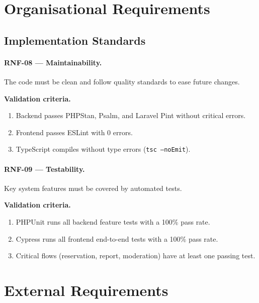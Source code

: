 \documentclass[11pt,a4paper,oneside]{report}
\begin{document}
\section{Organisational Requirements}

\subsection{Implementation Standards}
\label{nfr:implementation}

\paragraph{RNF-08 --- Maintainability.} \label{req:RNF-08}
The code must be clean and follow quality standards to ease future changes.

\textbf{Validation criteria.}
\begin{enumerate}
\item Backend passes PHPStan, Psalm, and Laravel Pint without critical errors.
\item Frontend passes ESLint with 0 errors.
\item TypeScript compiles without type errors (\texttt{tsc --noEmit}).
\end{enumerate}

\paragraph{RNF-09 --- Testability.} \label{req:RNF-09}
Key system features must be covered by automated tests.

\textbf{Validation criteria.}
\begin{enumerate}
\item PHPUnit runs all backend feature tests with a 100\% pass rate.
\item Cypress runs all frontend end-to-end tests with a 100\% pass rate.
\item Critical flows (reservation, report, moderation) have at least one passing test.
\end{enumerate}

\section{External Requirements}
\end{document}
